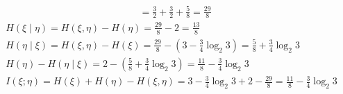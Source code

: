 \begin{tcolorbox}[breakable,colback=blue!5!white,colframe=blue!75!black,
 title= 解答题]
$$\begin{aligned}
&=\frac{3}{2}+\frac{3}{2}+\frac{5}{8}=\frac{29}{8} 
\end{aligned}$$
$$
\begin{array}{l}
H(\xi \mid \eta)=H(\xi, \eta)-H(\eta)=\frac{29}{8}-2=\frac{13}{8} \\
H(\eta \mid \xi)=H(\xi, \eta)-H(\xi)=\frac{29}{8}-\left(3-\frac{3}{4} \log _{2} 3\right)=\frac{5}{8}+\frac{3}{4} \log _{2} 3 \\
H(\eta)-H(\eta \mid \xi)=2-\left(\frac{5}{8}+\frac{3}{4} \log _{2} 3\right)=\frac{11}{8}-\frac{3}{4} \log _{2} 3 \\
I(\xi ; \eta)=H(\xi)+H(\eta)-H(\xi, \eta) =3-\frac{3}{4} \log _{2} 3+2-\frac{29}{8} =\frac{11}{8}-\frac{3}{4} \log _{2} 3 
\end{array}
$$

\end{tcolorbox}


